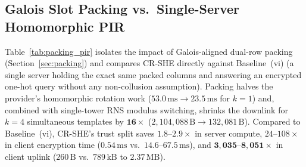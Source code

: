\documentclass[11pt,a4paper]{article}
\begin{document}
\subsection{Galois Slot Packing vs.\ Single-Server Homomorphic PIR}\label{sec:eval_packing}
Table~\ref{tab:packing_pir} isolates the impact of Galois-aligned dual-row packing (Section~\ref{sec:packing}) and compares CR-SHE directly against Baseline~(vi) (a single server holding the exact same packed columns and answering an encrypted one-hot query without any non-collusion assumption). Packing halves the provider's homomorphic rotation work ($53.0\,\text{ms} \to 23.5\,\text{ms}$ for $k=1$) and, combined with single-tower RNS modulus switching, shrinks the downlink for $k=4$ simultaneous templates by $\mathbf{16\times}$ ($2{,}104{,}088\,\text{B} \to 132{,}081\,\text{B}$). Compared to Baseline~(vi), CR-SHE's trust split saves $1.8\text{--}2.9\times$ in server compute, $24\text{--}108\times$ in client encryption time ($0.54\,\text{ms}$ vs.\ $14.6\text{--}67.5\,\text{ms}$), and $\mathbf{3{,}035\text{--}8{,}051\times}$ in client uplink ($260\,\text{B}$ vs.\ $789\,\text{kB}$ to $2.37\,\text{MB}$).

\begin{table}[t!]
\centering
\small
\renewcommand{\arraystretch}{1.14}
\caption{Fast-path provider latency, per-provider uplink, and per-provider downlink across unpacked, Galois-packed, and RNS-compressed layouts vs.\ single-server homomorphic PIR (Baseline~vi, 1-thread reference engine, medians of 21 runs).}
\label{tab:packing_pir}
\end{table}
\end{document}
